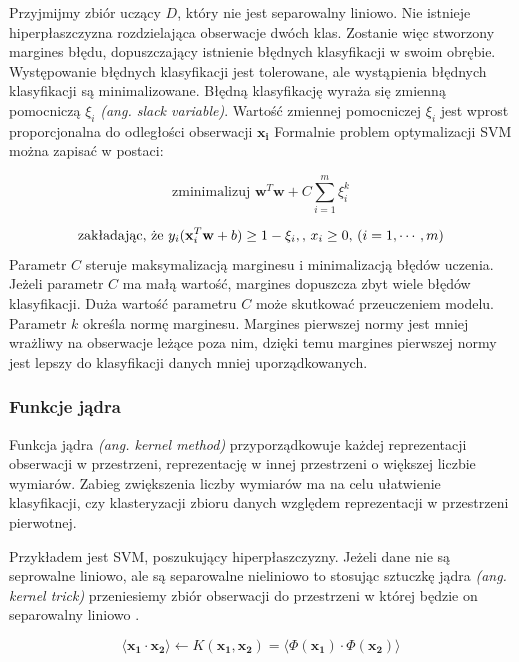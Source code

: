 \documentclass[a4paper,12pt,twoside,openany]{report}
\newcommand{\ang}[1]{\textit{(ang. #1)}}
\renewcommand{\vec}[1]{\bm{#1}}
\begin{document}
Przyjmijmy zbiór uczący $D$, który nie jest separowalny liniowo. 
Nie istnieje hiperpłaszczyzna rozdzielająca obserwacje dwóch klas.
Zostanie więc stworzony margines błędu, dopuszczający istnienie błędnych klasyfikacji w swoim obrębie.
Występowanie błędnych klasyfikacji jest tolerowane, ale wystąpienia błędnych klasyfikacji są minimalizowane.
Błędną klasyfikację wyraża się zmienną pomocniczą $\xi_i$ \ang{slack variable}. 
Wartość zmiennej pomocniczej $\xi_i$ jest wprost proporcjonalna do odległości obserwacji $\vec{x_i}$
Formalnie problem optymalizacji SVM można zapisać w postaci:

\begin{equation}
\mbox{zminimalizuj } {\vec w}^T {\vec w}+C\sum_{i=1}^m \xi_i^k
\end{equation}

\begin{equation}
	\mbox{zakładając, że }  y_i ({\bf x}_i^T {\bf w}+b) \ge 1-\xi_i,
	\mbox{, }x_i \ge 0 \mbox{, }(i=1,\cdots,m)
\end{equation}
Parametr $C$ steruje maksymalizacją marginesu i minimalizacją błędów uczenia.
Jeżeli parametr $C$ ma małą wartość, margines dopuszcza zbyt wiele błędów klasyfikacji.
Duża wartość parametru $C$ może skutkować przeuczeniem modelu.
Parametr $k$ określa normę marginesu. 
Margines pierwszej normy jest mniej wrażliwy na obserwacje leżące poza nim,
dzięki temu margines pierwszej normy jest lepszy do klasyfikacji danych mniej uporządkowanych.

\subsubsection{Funkcje jądra}
Funkcja jądra \ang{kernel method} 
przyporządkowuje każdej reprezentacji obserwacji w przestrzeni,
reprezentację w innej przestrzeni o większej liczbie wymiarów.
Zabieg zwiększenia liczby wymiarów ma na celu ułatwienie 
klasyfikacji, czy klasteryzacji zbioru danych względem
reprezentacji w przestrzeni pierwotnej. 

Przykładem jest SVM, poszukujący hiperpłaszczyzny.
Jeżeli dane nie są seprowalne liniowo,
ale są separowalne nieliniowo to stosując sztuczkę jądra \ang{kernel trick} 
przeniesiemy zbiór obserwacji do przestrzeni w której będzie on separowalny liniowo \cite{Patle2013}.

\begin{equation}
	\langle \vec{x_1} \cdot \vec{x_2} \rangle \gets K(\vec{x_1}, \vec{x_2}) = \langle \Phi(\vec{x_1}) \cdot \Phi(\vec{x_2}) \rangle
\end{equation}
\end{document}
